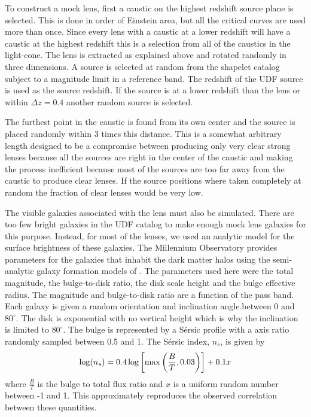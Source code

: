 \documentclass[useAMS,usenatbib]{mnras}
\newcommand{\degree}{^{\circ}}
\begin{document}
To construct a mock lens, first a caustic on the highest redshift source plane is selected.  This is done in order of Einstein area, but all the critical curves are used more than once.  Since every lens with a caustic at a lower redshift will have a caustic at the highest redshift this is a selection from all of the caustics in the light-cone.   The lens is extracted as explained above and rotated randomly in three dimensions.  A source is selected at random from the shapelet catalog subject to a magnitude limit in a reference band.   The redshift of the UDF source is used as the source redshift.  If the source is at a lower redshift than the lens or within $\Delta z = 0.4$ another random source is selected.

The furthest point in the caustic is found from its own center and the source is placed randomly within 3 times this distance.  This is a somewhat arbitrary length designed to be a compromise between producing only very clear strong lenses because all the sources are right in the center of the caustic and making the process  inefficient because most of the sources are too far away from the caustic to produce clear lenses.  If the source positions where taken completely at random the fraction of clear lenses would be very low.

The visible galaxies associated with the lens must also be simulated. There  are too few bright galaxies in the UDF catalog  to make enough mock lens galaxies for this purpose.  Instead, for most of the lenses, we used an analytic model for the surface brightness of these galaxies.  The Millennium Observatory provides parameters for the galaxies that inhabit the dark matter halos using the semi-analytic galaxy formation models of \citet{2011MNRAS.413..101G}.  The parameters used here were the total magnitude, the bulge-to-disk ratio, the disk scale height and the bulge effective radius.  The magnitude and bulge-to-disk ratio are a function of the pass band.  Each galaxy is given a random orientation and inclination angle.between 0 and $80\degree$.  The disk is exponential with no vertical height which is why the inclination is limited to $80\degree$.  The bulge is represented by a S\'{e}rsic profile with a axis ratio randomly sampled between 0.5 and 1.  The S\'{e}rsic index, $n_s$, is given by 
\begin{align}
\log( n_s )= 0.4 \log\left[ {\rm max}\left(\frac{B}{T},0.03\right)\right] + 0.1 x 
\end{align}
where $\frac{B}{T}$ is the bulge to total flux ratio and $x$ is a uniform random number between -1 and 1.  This approximately reproduces the observed correlation between these quantities. 
\end{document}
